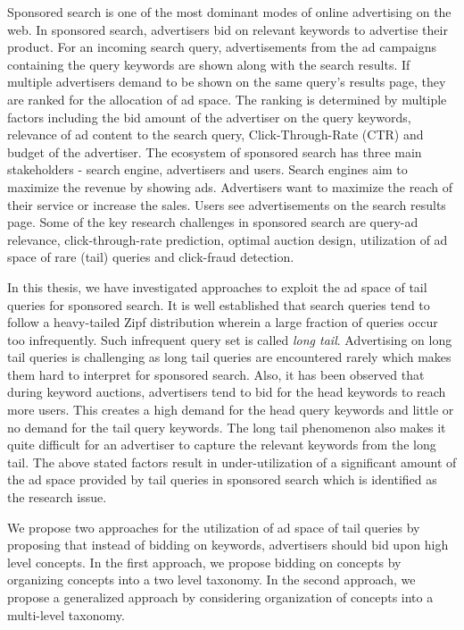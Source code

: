Sponsored search is one of the most dominant modes of online advertising on the web. In sponsored search, advertisers bid on relevant keywords   to advertise their product. For an incoming search query, advertisements from the ad campaigns containing the query keywords are shown along with the search results. If multiple advertisers demand to be shown on the same query's results page, they are ranked for the allocation of ad space. The ranking is determined by multiple factors including the bid amount of the advertiser on the query keywords, relevance of ad content to the search query, Click-Through-Rate (CTR) and budget of the advertiser. The ecosystem of sponsored search has three main stakeholders - search engine, advertisers and users. Search engines aim to maximize the revenue by showing ads. Advertisers want to maximize the reach of their service or increase the sales. Users  see advertisements on the search results page.  Some of the key research challenges in sponsored search are query-ad relevance, click-through-rate prediction, optimal auction design, utilization of ad space of rare (tail) queries and click-fraud detection.

In this thesis, we have investigated approaches to exploit the ad space of tail queries for sponsored search. It is well established that search queries tend to follow a heavy-tailed Zipf distribution wherein a large fraction of queries occur too infrequently. Such infrequent query set is called {\it long tail}. Advertising on long tail queries is challenging as long tail queries are encountered rarely which makes them hard to interpret for sponsored search. Also, it has been observed that during keyword auctions, advertisers tend to bid for the head keywords to reach more users. This creates a high demand for the head query keywords and little or no demand for the tail query keywords. The long tail phenomenon also makes it quite difficult for an advertiser to capture the relevant keywords from the long tail. The above stated factors result in under-utilization of a significant amount of the ad space provided by tail queries in sponsored search which is identified as the research issue.

We propose two approaches for the utilization of ad space of tail queries by proposing that instead of bidding on keywords, advertisers should bid upon high level concepts. In the first approach, we propose bidding on concepts by organizing concepts into a two level taxonomy. In the second approach, we propose a generalized approach by considering organization of concepts into a multi-level taxonomy.

